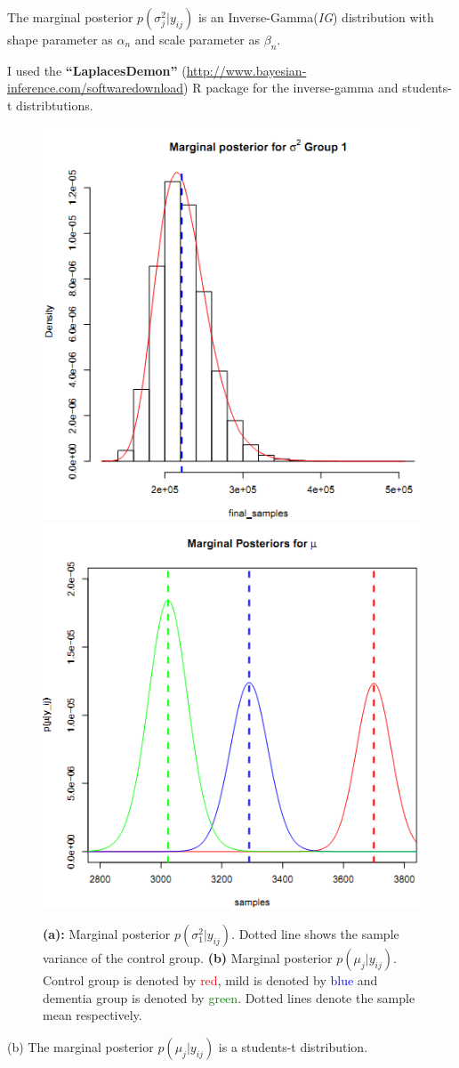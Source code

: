 \documentclass[11pt]{article}
\begin{document}
\par The marginal posterior $p(\sigma_{j}^{2} | y_{ij})$ is an Inverse-Gamma(\emph{IG}) distribution with shape parameter as $\alpha_n$ and scale parameter as $\beta_n$. 

\par I used the \textbf{``LaplacesDemon'' }(\url{http://www.bayesian-inference.com/softwaredownload}) R package for the inverse-gamma and students-t distribtutions.

\begin{figure}[!hbt]
 \includegraphics[width=0.5\linewidth] {img4a.png} 
 \includegraphics[width=0.5\linewidth] {img4b.png} 
\caption{\small{ {\bf (a):} Marginal posterior $p(\sigma^{2}_{1} | y_{ij})$. Dotted line shows the sample variance of the control group. {\bf (b)} Marginal posterior $p(\mu_{j} | y_{ij})$. Control group is denoted by \textcolor{red}{red}, mild is denoted by \textcolor{blue}{blue} and dementia group is denoted by \textcolor{green}{green}. Dotted lines denote the sample mean respectively. }}
\label{fig4ab}
\end{figure}
\vspace{-10pt}
\par (b) The marginal posterior $p(\mu_{j} | y_{ij})$ is a students-t distribution. 
\end{document}
